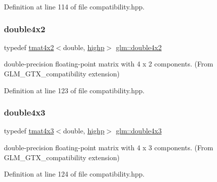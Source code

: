 Definition at line 114 of file compatibility.\+hpp.

\mbox{\label{group__gtx__compatibility_ga66ee22fb774d38f1484670c1afa230da}} 
\subsubsection{\texorpdfstring{double4x2}{double4x2}}
{\footnotesize\ttfamily typedef \mbox{\hyperlink{structglm_1_1tmat4x2}{tmat4x2}}$<$double, \mbox{\hyperlink{namespaceglm_a0f04f086094c747d227af4425893f545ac6f7eab42eacbb10d59a58e95e362074}{highp}}$>$ \mbox{\hyperlink{group__gtx__compatibility_ga66ee22fb774d38f1484670c1afa230da}{glm\+::double4x2}}}



double-\/precision floating-\/point matrix with 4 x 2 components. (From G\+L\+M\+\_\+\+G\+T\+X\+\_\+compatibility extension) 



Definition at line 123 of file compatibility.\+hpp.

\mbox{\label{group__gtx__compatibility_gadad0d5da7181385a05567469d4a5dd9a}} 
\subsubsection{\texorpdfstring{double4x3}{double4x3}}
{\footnotesize\ttfamily typedef \mbox{\hyperlink{structglm_1_1tmat4x3}{tmat4x3}}$<$double, \mbox{\hyperlink{namespaceglm_a0f04f086094c747d227af4425893f545ac6f7eab42eacbb10d59a58e95e362074}{highp}}$>$ \mbox{\hyperlink{group__gtx__compatibility_gadad0d5da7181385a05567469d4a5dd9a}{glm\+::double4x3}}}



double-\/precision floating-\/point matrix with 4 x 3 components. (From G\+L\+M\+\_\+\+G\+T\+X\+\_\+compatibility extension) 



Definition at line 124 of file compatibility.\+hpp.

\mbox{\label{group__gtx__compatibility_ga83ac0f28025f5e999b03094400fbddcb}} 
